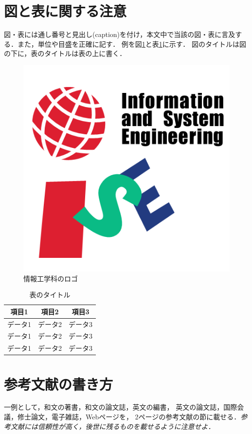 \documentclass[uplatex,dvipdfmx,10pt,a4paper,notitlepage,oneside,twocolumn]{abst_jsarticle}
\begin{document}
\section{図と表に関する注意}

図・表には通し番号と見出し(caption)を付け，本文中で当該の図・表に言及する．また，単位や目盛を正確に記す．
例を図\ref{fig:logo}と表\ref{tab:results}に示す．
図のタイトルは図の下に，表のタイトルは表の上に書く．


\begin{figure}[t]
    \centering
    \includegraphics[width=0.52\linewidth]{logo_color.png}
    \caption{情報工学科のロゴ}
    \label{fig:logo}
  \end{figure}

\begin {table}[t]
    \centering
  \caption{表のタイトル}
  \label{tab:results}
  \begin {tabular}{ccc} \hline
     項目1 & 項目2 & 項目3 \\ \hline
    データ1 & データ2 & データ3 \\
    データ1 & データ2 & データ3 \\
    データ1 & データ2 & データ3 \\ \hline
  \end {tabular}
\end {table}

\section{参考文献の書き方}

一例として，和文の著書\cite{suetake}，和文の論文誌\cite{kusano}，英文の編書\cite{fuortes}，
英文の論文誌\cite{rice}，国際会議\cite{guibas}，修士論文\cite{chudai}，電子雑誌\cite{iwama}，Webページ\cite{IPSJ}を，
2ページの参考文献の節に載せる．{\em 参考文献には信頼性が高く，後世に残るものを載せるように注意せよ．}
\end{document}
